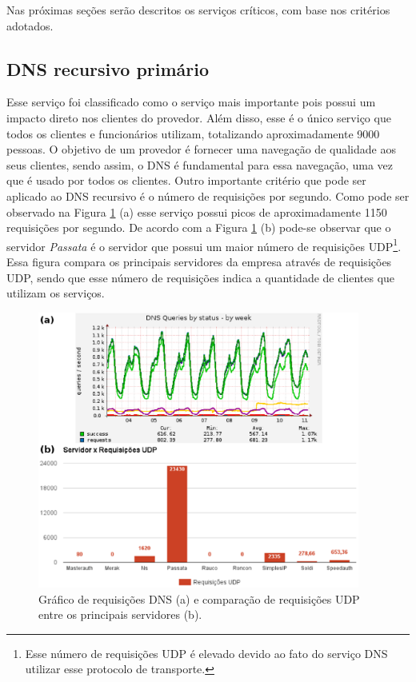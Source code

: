 Nas próximas seções serão descritos os serviços críticos, com base nos critérios adotados.

\subsection{DNS recursivo primário}
\label{section:dnsrecprim}

Esse serviço foi classificado como o serviço mais importante pois possui um impacto direto nos clientes do provedor. Além disso, esse é o único 
serviço que todos os clientes e funcionários utilizam, totalizando aproximadamente 9000 pessoas. O objetivo de um provedor é fornecer uma navegação 
de qualidade aos seus clientes, sendo assim, o \ac{DNS} é fundamental para essa navegação, uma vez que é usado por todos os clientes. Outro 
importante critério que pode ser aplicado ao \ac{DNS} recursivo é o número de requisições por segundo. Como pode ser observado na Figura 
\ref{fig:dns_udp} (a) esse serviço possui picos de aproximadamente 1150 requisições por segundo. De acordo com a Figura \ref{fig:dns_udp} (b) 
pode-se observar que o servidor \textit{Passata} é o servidor que possui um maior número de requisições \ac{UDP}\footnote[1]{Esse número de 
requisições \ac{UDP} é elevado devido ao fato do serviço \ac{DNS} utilizar esse protocolo de transporte.}. Essa figura compara os principais 
servidores da empresa através de requisições \ac{UDP}, sendo que esse número de requisições indica a quantidade de clientes que utilizam os 
serviços.

\begin{figure}[h!]
 \centering
 \includegraphics[width=400px]{img/dns_udp.eps}
 \caption{Gráfico de requisições DNS (a) e comparação de requisições UDP entre os principais servidores (b).}
 \label{fig:dns_udp}
\end{figure}


